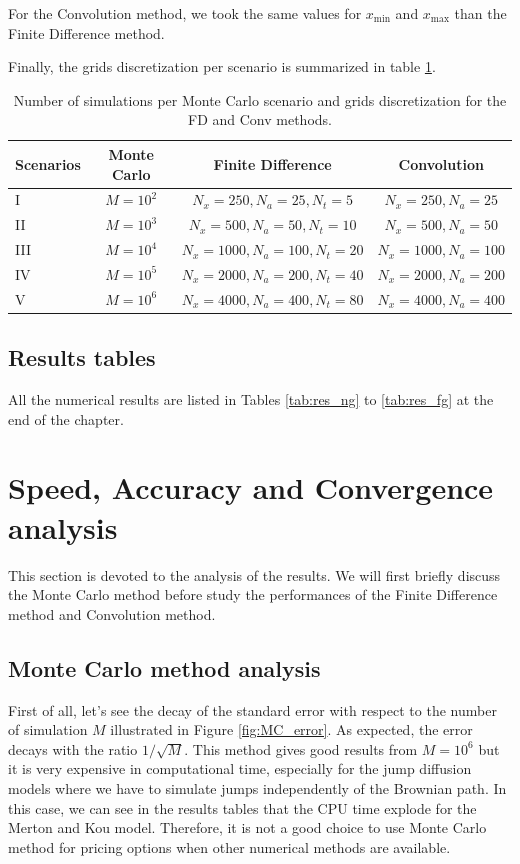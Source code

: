 For the Convolution method, we took the same values for $x_{\min}$ and $x_{\max}$ than the Finite Difference method.

Finally, the grids discretization per scenario is summarized in table \ref{tab:settings}. 

\begin{table}[!ht]
\centering
  \begin{tabular}{l||c|c|c}
    \toprule
    Scenarios & Monte Carlo & Finite Difference & Convolution \\
    \toprule
   	I 	& $M=10^2$ & $N_x=250,N_a=25,N_t=5$    & $N_x=250,N_a=25$\\
  	II 	& $M=10^3$ & $N_x=500,N_a=50,N_t=10$   & $N_x=500,N_a=50$\\
    III & $M=10^4$ & $N_x=1000,N_a=100,N_t=20$ & $N_x=1000,N_a=100$\\
    IV 	& $M=10^5$ & $N_x=2000,N_a=200,N_t=40$ & $N_x=2000,N_a=200$\\
    V 	& $M=10^6$ & $N_x=4000,N_a=400,N_t=80$ & $N_x=4000,N_a=400$\\
    \bottomrule
  \end{tabular}
  \vspace{5pt}
  \caption{\label{tab:settings} Number of simulations per Monte Carlo scenario and grids discretization for the FD and Conv methods.}
\end{table}

\subsection{Results tables}
All the numerical results are listed in Tables \ref{tab:res_ng} to \ref{tab:res_fg} at the end of the chapter.

\section{Speed, Accuracy and Convergence analysis}
\label{sec:res:analysis}
This section is devoted to the analysis of the results. We will first briefly discuss the Monte Carlo method before study the performances of the Finite Difference method and Convolution method.

\subsection{Monte Carlo method analysis}
First of all, let's see the decay of the standard error with respect to the number of simulation $M$ illustrated in Figure \ref{fig:MC_error}. As expected, the error decays with the ratio $1/\sqrt{M}$. This method gives good results from $M = 10^6$ but it is very expensive in computational time, especially for the jump diffusion models where we have to simulate jumps independently of the Brownian path. In this case, we can see in the results tables that the CPU time explode for the Merton and Kou model. Therefore, it is not a good choice to use Monte Carlo method for pricing options when other numerical methods are available.

